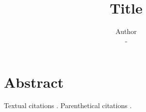 \documentclass{article}
\title{Title}
\author{Author\\
  \small - \\
}
\begin{document}
\maketitle


\section{Abstract}
Textual citations \citet{knuth_1986}. Parenthetical citations \citep{knuth_1986}.


{}

\end{document}
